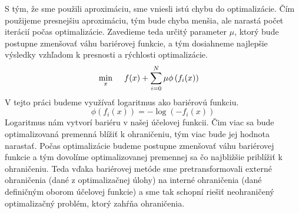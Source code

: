 S tým, že sme použili aproximáciu, sme vniesli istú chybu do optimalizácie. Čím použijeme presnejšiu aproximáciu, tým bude chyba menšia, ale narastá počet iterácií počas optimalizácie. Zavedieme teda určitý parameter $\mu$, ktorý bude postupne zmenšovať váhu bariérovej funkcie, a tým dosiahneme najlepšie výsledky vzhľadom k presnosti a rýchlosti optimalizácie.  
\begin{align}
\displaystyle \min_{x} \hspace{0.5cm} & 
f(x) + \sum_{i=0}^{N}\mu\phi\left(f_{i}(x)\right)
\end{align}
V tejto práci budeme využívať logaritmus ako bariérovú funkciu.
\begin{equation}
	\phi\left(f_{i}(x)\right) = -\log(-f_{i}(x))
\end{equation}
Logaritmus nám vytvorí bariéru v našej účelovej funkcii. Čim viac sa bude optimalizovaná premenná blížiť k ohraničeniu, tým viac bude jej hodnota narastať. Počas optimalizácie budeme postupne zmenšovať váhu bariérovej funkcie a tým dovolíme optimalizovanej premennej sa čo najbližšie priblížiť k ohraničeniu. Teda vďaka bariérovej metóde sme pretransformovali externé ohraničenia (dané z optimalizačnej úlohy) na interné ohraničenia (dané definičným oborom účelovej funkcie) a sme tak schopní riešiť neohraničený optimalizačný problém, ktorý zahŕňa ohraničenia. 